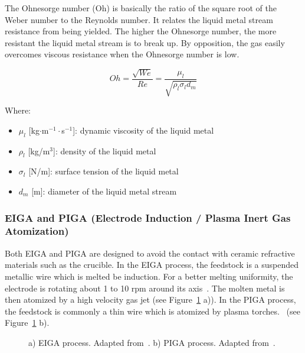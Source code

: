 \documentclass[../main]{subfiles}
\begin{document}
The Ohnesorge number (Oh) is basically the ratio of the square root of the Weber number to the Reynolds number. It relates the liquid metal stream resistance from being yielded. The higher the Ohnesorge number, the more resistant the liquid metal stream is to break up. By opposition, the gas easily overcomes viscous resistance when the Ohnesorge number is low.

\vspace{0mm}
\begin{equation}
Oh = \frac{\sqrt{We}}{Re} = \frac{\mu_{l}}{\sqrt{\rho_{l} \sigma_{l} d_{m}}}
\label{e:ohnesorge_number}
\end{equation}
\vspace{0mm}

\vspace{0mm}
\begin{minipage}{\linewidth}
Where:
\begin{itemize}
    \item[] $\mu_{l}$ [kg$\cdot$m$^{-1}\cdot$s$^{-1}$]: dynamic viscosity of the liquid metal 
    \item[] $\rho_{l}$ [kg/m$^{3}$]: density of the liquid metal
    \item[] $\sigma_{l}$ [N/m]: surface tension of the liquid metal
    \item[] $d_{m}$ [m]: diameter of the liquid metal stream
\end{itemize}
\end{minipage}
\vspace{0mm}

\subsubsection{EIGA and PIGA (Electrode Induction / Plasma Inert Gas Atomization)}
Both EIGA and PIGA are designed to avoid the contact with ceramic refractive materials such as the crucible. In the EIGA process, the feedstock is a suspended metallic wire which is melted be induction. For a better melting uniformity, the electrode is rotating about 1 to 10 rpm around its axis~\cite{Spitans2020NumericalModeling}. The molten metal is then atomized by a high velocity gas jet (see Figure~\ref{f:eiga_piga} a)). In the PIGA process, the feedstock is commonly a thin wire which is atomized by plasma torches.~\cite{Kassym2020AtomizationProcesses, Sun2017ReviewMethods} (see Figure~\ref{f:eiga_piga} b).

\vspace{0mm}
\begin{figure}[H]
    \centering
        
        \caption[EIGA and PIGA processes]{a) EIGA process. Adapted from~\cite{Spitans2020NumericalModeling}. b) PIGA process. Adapted from~\cite{Sun2017ReviewMethods,Chen2018ComparativeStudy}.}
        \label{f:eiga_piga}
\end{figure}
\FloatBarrier
\vspace{0mm}
\end{document}
